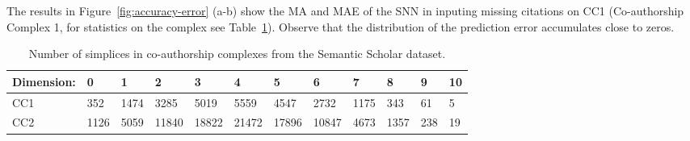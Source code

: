 The results in Figure~\ref{fig:accuracy-error} (a-b) show the MA and MAE of the SNN in inputing missing citations on CC1 (Co-authorship Complex 1, for statistics on the complex see Table~\ref{table:Simplices-coauthor}). Observe that the distribution of the prediction error accumulates close to zeros.
\begin{table}[htbp]\label{table:Simplices-coauthor}
  \centering
  \scriptsize{
  \begin{tabular}{llllllllllll}
    \cmidrule(r){1-12}
    Dimension:   & 0     & 1  & 2     & 3 & 4     & 5 & 6    & 7 & 8   & 9 & 10\\
    \midrule
    CC1 & 352  & 1474  & 3285  & 5019  & 5559  & 4547  & 2732  & 1175  & 343 & 61 & 5\\
    CC2 & 1126 & 5059 & 11840 & 18822 & 21472 & 17896  & 10847 & 4673 & 1357 & 238 & 19\\ 
    \bottomrule
  \end{tabular}}
  \vspace{2pt}
  \caption{%
  Number of simplices in co-authorship complexes from the Semantic Scholar dataset.
  }
\end{table}
